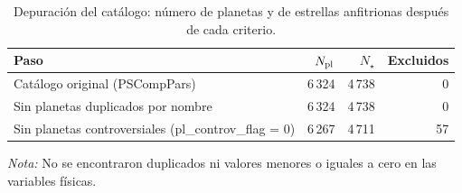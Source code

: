 \begin{table}[htbp]
    \centering
    \caption{Depuración del catálogo: número de planetas y de estrellas anfitrionas después de cada criterio.}
    \label{tab:D-T1}
    \small
    \begin{tabular}{p{}rrr}
    \toprule
    Paso & $N_{\rm pl}$ & $N_\star$ & Excluidos \\
    \midrule
    Catálogo original (PSCompPars) & 6\,324 & 4\,738 & 0 \\
    Sin planetas duplicados por nombre & 6\,324 & 4\,738 & 0 \\
    Sin planetas controversiales (pl\_controv\_flag = 0) & 6\,267 & 4\,711 & 57 \\
    \bottomrule
    \end{tabular}
    \par\smallskip
    {\footnotesize\textit{Nota:} No se encontraron duplicados ni valores menores o iguales a cero en las variables físicas.}
\end{table}
